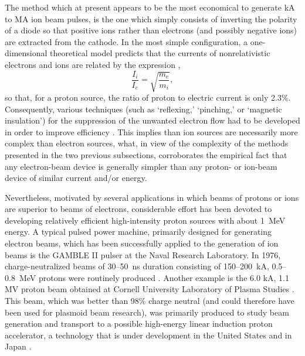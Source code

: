 \documentclass [12pt,a4paper,     ]{report} %
\begin{document}
The method which at present appears to be the most economical to generate kA to MA ion beam pulses, is the one which simply consists of inverting the polarity of a diode so that positive ions rather than electrons (and possibly negative ions)  are extracted from the cathode.  In the most simple configuration, a one-dimensional theoretical model predicts that the currents of nonrelativistic electrons and ions are related by the expression \cite{GOLDE1981-}, \cite[p.57]{MILLE1982-}
%
\begin{equation} \label{hip:1}
\frac{I_i}{I_e} = \sqrt{\frac{m_e}{m_i}},
\end{equation}
%
so that, for a proton source, the ratio of proton to electric current is only 2.3\%.  Consequently, various techniques (such as `reflexing,' `pinching,' or `magnetic insulation') for the suppression of the unwanted electron flow had to be developed in order to improve efficiency \cite{NATIO1979-,GOLDE1981-}.  This implies than ion sources are necessarily more complex than electron sources, what, in view of the complexity of the methods presented in the two previous subsections, corroborates the empirical fact that any electron-beam device is generally simpler than any proton- or ion-beam device of similar current and/or energy. 

Nevertheless, motivated by several applications in which beams of protons or ions are superior to beams of electrons, considerable effort has been devoted to developing relatively efficient high-intensity proton sources with about 1~MeV energy.  A typical pulsed power machine, primarily designed for generating electron beams, which has been successfully applied to the generation of ion beams is the GAMBLE II pulser at the Naval Research Laboratory.  In 1976, charge-neutralized beams of 30--50~ns duration consisting of 150--200~kA, 0.5--0.8~MeV protons were routinely produced \cite{STEPH1976-}.  Another example is the 6.0 kA, 1.1 MV proton beam obtained at Cornell University Laboratory of Plasma Studies \cite{ROTH-1985-}.  This beam, which was better than 98\% charge neutral (and could therefore have been used for plasmoid beam research), was primarily produced to study beam generation and transport to a possible high-energy linear induction proton  accelerator, a technology that is under development in the United States \cite{IVERS1981-, YU---1996-} and in Japan \cite{KAWAS1983-, HORIO1998-, HASEG2000-}.
\end{document}
